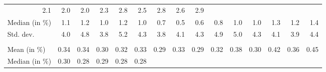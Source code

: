 \begin{tabular}{lllllllllllllll}
  \multicolumn{1}{r}{2.1} &
  \multicolumn{1}{r}{2.0} &
  \multicolumn{1}{r}{2.0} &
  \multicolumn{1}{r}{2.3} &
  \multicolumn{1}{r}{2.8} &
  \multicolumn{1}{r}{2.5} &
  \multicolumn{1}{r}{2.8} &
  \multicolumn{1}{r}{2.6} &
  \multicolumn{1}{r}{2.9} \\
\multicolumn{1}{l}{\hspace{2em}Median (in $\%$)} &
  \multicolumn{1}{|r}{1.1} &
  \multicolumn{1}{r}{1.2} &
  \multicolumn{1}{r}{1.0} &
  \multicolumn{1}{r}{1.2} &
  \multicolumn{1}{r}{1.0} &
  \multicolumn{1}{r}{0.7} &
  \multicolumn{1}{r}{0.5} &
  \multicolumn{1}{r}{0.6} &
  \multicolumn{1}{r}{0.8} &
  \multicolumn{1}{r}{1.0} &
  \multicolumn{1}{r}{1.0} &
  \multicolumn{1}{r}{1.3} &
  \multicolumn{1}{r}{1.2} &
  \multicolumn{1}{r}{1.4} \\
\multicolumn{1}{l}{\hspace{2em}Std. dev.} &
  \multicolumn{1}{|r}{4.0} &
  \multicolumn{1}{r}{4.8} &
  \multicolumn{1}{r}{3.8} &
  \multicolumn{1}{r}{5.2} &
  \multicolumn{1}{r}{4.3} &
  \multicolumn{1}{r}{3.8} &
  \multicolumn{1}{r}{4.1} &
  \multicolumn{1}{r}{4.3} &
  \multicolumn{1}{r}{4.9} &
  \multicolumn{1}{r}{5.0} &
  \multicolumn{1}{r}{4.3} &
  \multicolumn{1}{r}{4.1} &
  \multicolumn{1}{r}{3.9} &
  \multicolumn{1}{r}{4.4} \\
\multicolumn{1}{l}{\hspace{1em}{\textit{Elasticity} ($\widehat{\beta}$)}} &
  \multicolumn{1}{|r}{} &
  \multicolumn{1}{r}{} &
  \multicolumn{1}{r}{} &
  \multicolumn{1}{r}{} &
  \multicolumn{1}{r}{} &
  \multicolumn{1}{r}{} &
  \multicolumn{1}{r}{} &
  \multicolumn{1}{r}{} &
  \multicolumn{1}{r}{} &
  \multicolumn{1}{r}{} &
  \multicolumn{1}{r}{} &
  \multicolumn{1}{r}{} &
  \multicolumn{1}{r}{} &
  \multicolumn{1}{r}{} \\
\multicolumn{1}{l}{\hspace{2em}Mean (in $\%$)} &
  \multicolumn{1}{|r}{0.34} &
  \multicolumn{1}{r}{0.34} &
  \multicolumn{1}{r}{0.30} &
  \multicolumn{1}{r}{0.32} &
  \multicolumn{1}{r}{0.33} &
  \multicolumn{1}{r}{0.29} &
  \multicolumn{1}{r}{0.33} &
  \multicolumn{1}{r}{0.29} &
  \multicolumn{1}{r}{0.32} &
  \multicolumn{1}{r}{0.38} &
  \multicolumn{1}{r}{0.30} &
  \multicolumn{1}{r}{0.42} &
  \multicolumn{1}{r}{0.36} &
  \multicolumn{1}{r}{0.45} \\
\multicolumn{1}{l}{\hspace{2em}Median (in $\%$)} &
  \multicolumn{1}{|r}{0.30} &
  \multicolumn{1}{r}{0.28} &
  \multicolumn{1}{r}{0.29} &
  \multicolumn{1}{r}{0.28} &
  \multicolumn{1}{r}{0.28} &

\end{tabular}
